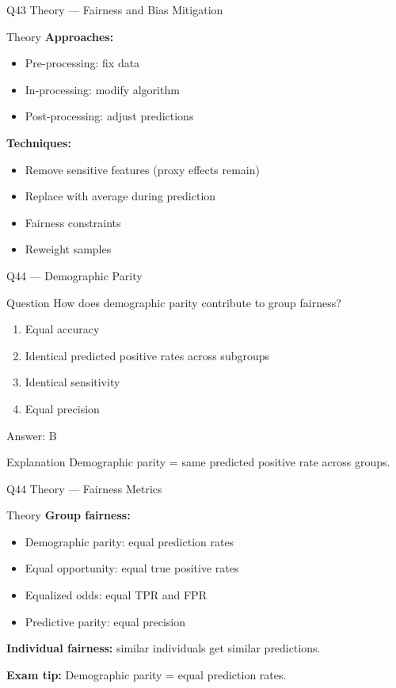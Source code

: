 \documentclass[aspectratio=169,8pt]{beamer}
\begin{document}
	\begin{frame}{Q43 Theory --- Fairness and Bias Mitigation}
		\begin{block}{Theory}
			\textbf{Approaches:}
			\begin{itemize}
				\item Pre-processing: fix data
				\item In-processing: modify algorithm
				\item Post-processing: adjust predictions
			\end{itemize}
			\textbf{Techniques:}
			\begin{itemize}
				\item Remove sensitive features (proxy effects remain)
				\item Replace with average during prediction
				\item Fairness constraints
				\item Reweight samples
			\end{itemize}
		\end{block}
	\end{frame}
	
	\begin{frame}{Q44 --- Demographic Parity}
		\begin{block}{Question}
			How does demographic parity contribute to group fairness?
		\end{block}
		\begin{enumerate}[label=\Alph*.]
			\item Equal accuracy
			\item Identical predicted positive rates across subgroups
			\item Identical sensitivity
			\item Equal precision
		\end{enumerate}
		\begin{exampleblock}{Answer: B}
		\end{exampleblock}
		\begin{block}{Explanation}
			Demographic parity = same predicted positive rate across groups.
		\end{block}
	\end{frame}
	
	\begin{frame}{Q44 Theory --- Fairness Metrics}
		\begin{block}{Theory}
			\textbf{Group fairness:}
			\begin{itemize}
				\item Demographic parity: equal prediction rates
				\item Equal opportunity: equal true positive rates
				\item Equalized odds: equal TPR and FPR
				\item Predictive parity: equal precision
			\end{itemize}
			\textbf{Individual fairness:} similar individuals get similar predictions.
			\vspace{2mm}
			
			\textbf{Exam tip:} Demographic parity = equal prediction rates.
		\end{block}
	\end{frame}
	
\end{document}
